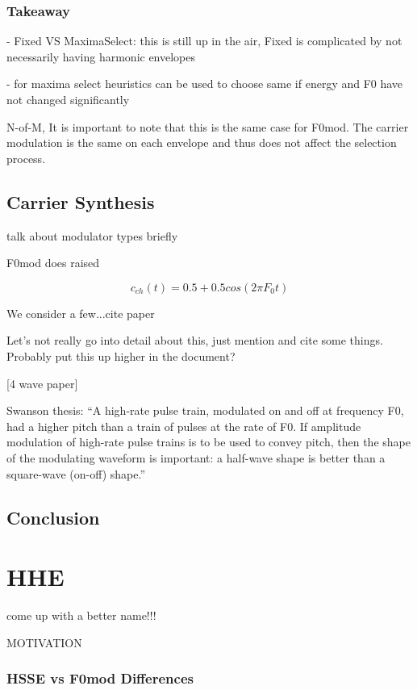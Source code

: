 \documentclass [11pt, proquest] {uwthesis}[2015/03/03]
\begin{document}
\subsection{Takeaway}

 - Fixed VS MaximaSelect: this is still up in the air, Fixed is complicated by not necessarily having harmonic envelopes
 
 - for maxima select heuristics can be used to choose same if energy and F0 have not changed significantly
 


N-of-M, It is important to note that this is the same case for F0mod.  The carrier modulation is the same on each envelope and thus does not affect the selection process.
 
 


\section{Carrier Synthesis}

talk about modulator types briefly

F0mod does raised

$$c_{ch}(t) = 0.5 + 0.5cos(2\pi F_0t)$$


We consider a few...cite paper

Let's not really go into detail about this, just mention and cite some things.  Probably put this up higher in the document?

[4 wave paper]

Swanson thesis: ``A high-rate pulse train, modulated on and off at frequency F0, had a higher pitch than a train of pulses at the rate of F0. If amplitude modulation of high-rate pulse trains is to be used to convey pitch, then the shape of the modulating waveform is important: a half-wave shape is better than a square-wave (on-off) shape.''


\section{Conclusion}



\chapter{HHE}
come up with a better name!!!

MOTIVATION

\subsection{HSSE vs F0mod Differences}
\end{document}
